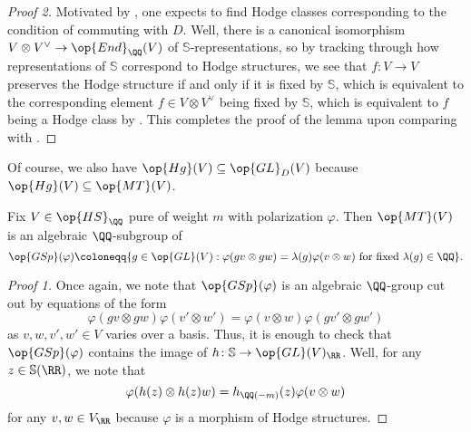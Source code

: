 \documentclass[../thesis.tex]{subfiles}
\begin{document}
\begin{proof}[Proof 2]
	Motivated by , one expects to find Hodge classes corresponding to the condition of commuting with $D$. Well, there is a canonical isomorphism $V\otimes V^\lor\to\op{End}_\QQ(V)$ of $\mathbb S$-representations, so by tracking through how representations of $\mathbb S$ correspond to Hodge structures, we see that $f\colon V\to V$ preserves the Hodge structure if and only if it is fixed by $\mathbb S$, which is equivalent to the corresponding element $f\in V\otimes V^\lor$ being fixed by $\mathbb S$, which is equivalent to $f$ being a Hodge class by . This completes the proof of the lemma upon comparing with .
\end{proof}
\begin{remark}
	Of course, we also have $\op{Hg}(V)\subseteq\op{GL}_D(V)$ because $\op{Hg}(V)\subseteq\op{MT}(V)$.
\end{remark}
\begin{lemma} \label{lem:mt-commutes-polarization}
	Fix $V\in\op{HS}_\QQ$ pure of weight $m$ with polarization $\varphi$. Then $\op{MT}(V)$ is an algebraic $\QQ$-subgroup of
	\[\op{GSp}(\varphi)\coloneqq\{g\in\op{GL}(V):\varphi(gv\otimes gw)=\lambda(g)\varphi(v\otimes w)\text{ for fixed }\lambda(g)\in\QQ\}.\]
\end{lemma}
\begin{proof}[Proof 1]
	Once again, we note that $\op{GSp}(\varphi)$ is an algebraic $\QQ$-group cut out by equations of the form
	\[\varphi(gv\otimes gw)\varphi(v'\otimes w')=\varphi(v\otimes w)\varphi(gv'\otimes gw')\]
	as $v,w,v',w'\in V$ varies over a basis. Thus, it is enough to check that $\op{GSp}(\varphi)$ contains the image of $h\colon\mathbb S\to\op{GL}(V)_\RR$. Well, for any $z\in\mathbb S(\RR)$, we note that
	\[\varphi(h(z)\otimes h(z)w)=h_{\QQ(-m)}(z)\varphi(v\otimes w)\]
	for any $v,w\in V_\RR$ because $\varphi$ is a morphism of Hodge structures.
\end{proof}
\end{document}
